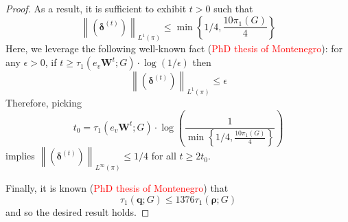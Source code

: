 \documentclass{article}
\newcommand{\norm}[1]{\left\lVert#1\right\rVert}
\newcommand{\1}{\mathbf{1}}
\newcommand{\qbf}{\mathbf{q}}
\newcommand{\rhobf}{\bm{\rho}}
\newcommand{\deltabf}{\bm{\delta}}
\newcommand{\Wbf}{\mathbf{W}}
\theoremstyle{aldenthm}
\begin{document}
\begin{proof}
	As a result, it is sufficient to exhibit $t > 0$ such that
	\begin{equation*}
	\norm{(\deltabf^{(t)})}_{L^{1}(\pi)} \leq \min \left\{1/4,\frac{10 \pi_1(G)}{4}\right\}
	\end{equation*}
	Here, we leverage the following well-known fact (\textcolor{red}{PhD thesis of Montenegro}): for any $\epsilon > 0$, if $t \geq \tau_1(e_v \Wbf^t; G) \cdot \log(1/\epsilon)$ then
	\begin{equation*}
	\norm{(\deltabf^{(t)})}_{L^{1}(\pi)} \leq \epsilon
	\end{equation*}
	Therefore, picking 
	\begin{equation*}
	t_0 = \tau_1(e_v \Wbf^t; G) \cdot \log \left(\frac{1}{\min\left\{1/4,\frac{10 \pi_1(G)}{4}\right\}}\right)
	\end{equation*} implies $\norm{(\deltabf^{(t)})}_{L^{\infty}(\pi)} \leq 1/4$ for all $t \geq 2 t_0$. 
	
	Finally, it is known (\textcolor{red}{PhD thesis of Montenegro}) that
	\begin{equation*}
	\tau_{1}(\qbf; G) \leq 1376 \tau_{1}(\rhobf; G)
	\end{equation*}
	and so the desired result holds.
	
\end{proof}
\end{document}
